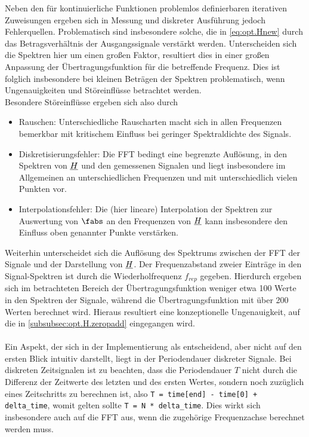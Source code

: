\documentclass[../Report.tex]{subfiles}
\begin{document}
Neben den für kontinuierliche Funktionen problemlos definierbaren iterativen Zuweisungen ergeben sich in Messung und diskreter Ausführung jedoch Fehlerquellen. Problematisch sind insbesondere solche, die in \eqref{eq:opt.Hnew} durch das Betragsverhältnis der Ausgangssignale verstärkt werden. 
Unterscheiden sich die Spektren hier um einen großen Faktor, resultiert dies in einer großen Anpassung der Übertragungsfunktion für die betreffende Frequenz. Dies ist folglich insbesondere bei kleinen Beträgen der Spektren problematisch, wenn Ungenauigkeiten und Störeinflüsse betrachtet werden. 
\\
Besondere Störeinflüsse ergeben sich also durch
\begin{itemize}
	\item Rauschen: Unterschiedliche Rauscharten macht sich in allen Frequenzen bemerkbar mit kritischem Einfluss bei geringer Spektraldichte des Signals.\cite[S. 205 ff.]{lerch10}
	
	\item Diskretisierungsfehler: Die FFT bedingt eine begrenzte Auflösung, in den Spektren von $\underline{H}$ und den gemessenen Signalen und liegt insbesondere im Allgemeinen an unterschiedlichen Frequenzen und mit unterschiedlich vielen Punkten vor.
	
	\item Interpolationsfehler: Die (hier lineare) Interpolation der Spektren zur Auswertung von $\fabs$ an den Frequenzen von $\underline{H}$ kann insbesondere den Einfluss oben genannter Punkte verstärken.
\end{itemize}

Weiterhin unterscheidet sich die Auflösung des Spektrums zwischen der FFT der Signale und der Darstellung von $\underline{H}$. Der Frequenzabstand zweier Einträge in den Signal-Spektren ist durch die Wiederholfrequenz $f_{rep}$ gegeben. Hierdurch ergeben sich im betrachteten Bereich der Übertragungsfunktion weniger etwa 100 Werte in den Spektren der Signale, während die Übertragungsfunktion mit über 200 Werten berechnet wird. Hieraus resultiert eine konzeptionelle Ungenauigkeit, auf die in \ref{subsubsec:opt.H.zeropadd} eingegangen wird. 
\\
\\
Ein Aspekt, der sich in der Implementierung als entscheidend, aber nicht auf den ersten Blick intuitiv darstellt, liegt in der Periodendauer diskreter Signale. Bei diskreten Zeitsignalen ist zu beachten, dass die Periodendauer $T$ nicht durch die Differenz der Zeitwerte des letzten und des ersten Wertes, sondern noch zuzüglich eines Zeitschritts  zu berechnen ist, also \lstinline{T = time[end] - time[0] + delta_time}, womit gelten sollte \lstinline{T = N * delta_time}. Dies wirkt sich insbesondere auch auf die FFT aus, wenn die zugehörige Frequenzachse berechnet werden muss.
\end{document}
